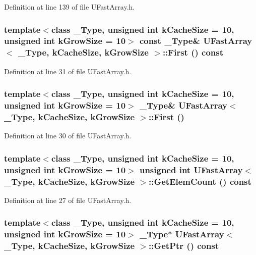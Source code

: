 Definition at line 139 of file UFastArray.h.\hypertarget{class_u_fast_array_fc704c356efce5b8dfb26458f7fbf413}{
\subsubsection[{First}]{\setlength{\rightskip}{0pt plus 5cm}template$<$class \_\-Type, unsigned int kCacheSize = 10, unsigned int kGrowSize = 10$>$ const \_\-Type\& {\bf UFastArray}$<$ \_\-Type, kCacheSize, kGrowSize $>$::First () const}}
\label{class_u_fast_array_fc704c356efce5b8dfb26458f7fbf413}




Definition at line 31 of file UFastArray.h.\hypertarget{class_u_fast_array_63b17c1f39f318512e9f2fc73d0eabd7}{
\subsubsection[{First}]{\setlength{\rightskip}{0pt plus 5cm}template$<$class \_\-Type, unsigned int kCacheSize = 10, unsigned int kGrowSize = 10$>$ \_\-Type\& {\bf UFastArray}$<$ \_\-Type, kCacheSize, kGrowSize $>$::First ()}}
\label{class_u_fast_array_63b17c1f39f318512e9f2fc73d0eabd7}




Definition at line 30 of file UFastArray.h.\hypertarget{class_u_fast_array_0f656de7d6eb46b1a090bd3b1c26cb35}{
\subsubsection[{GetElemCount}]{\setlength{\rightskip}{0pt plus 5cm}template$<$class \_\-Type, unsigned int kCacheSize = 10, unsigned int kGrowSize = 10$>$ unsigned int {\bf UFastArray}$<$ \_\-Type, kCacheSize, kGrowSize $>$::GetElemCount () const}}
\label{class_u_fast_array_0f656de7d6eb46b1a090bd3b1c26cb35}




Definition at line 27 of file UFastArray.h.\hypertarget{class_u_fast_array_8db9c643b2bd8c7a2a4770e74ca76e31}{
\subsubsection[{GetPtr}]{\setlength{\rightskip}{0pt plus 5cm}template$<$class \_\-Type, unsigned int kCacheSize = 10, unsigned int kGrowSize = 10$>$ \_\-Type$\ast$ {\bf UFastArray}$<$ \_\-Type, kCacheSize, kGrowSize $>$::GetPtr () const}}
\label{class_u_fast_array_8db9c643b2bd8c7a2a4770e74ca76e31}




